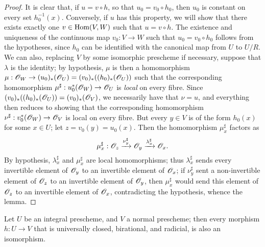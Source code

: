 \begin{proof}
It is clear that, if $u=v\circ h$, so that $u_0=v_0\circ h_0$, then $u_0$ is constant on every set $h_0^{-1}(x)$.
Conversely, if $u$ has this property, we will show that there exists exactly one $v\in\operatorname{Hom}(V,W)$ such that $u=v\circ h$.
The existence and uniqueness of the continuous map $v_0:V\to W$ such that $u_0=v_0\circ h_0$ follows from the hypotheses, since $h_0$ can be identified with the canonical map from $U$ to $U/R$.
We can also, replacing $V$ by some isomorphic prescheme if necessary, suppose that $\lambda$ is the identity;
by hypothesis, $\mu$ is then a homomorphism $\mu:\sh{O}_W\to(u_0)_*(\sh{O}_U) = (v_0)_*((h_0)_*(\sh{O}_U))$ such that the corresponding homomorphism $\mu^\sharp:u_0^*(\sh{O}_W)\to\sh{O}_U$ is \emph{local} on every fibre.
Since $(v_0)_*((h_0)_*(\mathscr{O}_U))=(v_0)_*(\mathscr{O}_V)$, we necessarily have that $\nu=u$, and everything then reduces to showing that the corresponding homomorphism $\nu^\sharp:v_0^*(\sh{O}_W)\to\sh{O}_V$ is local on every fibre.
But every $y\in V$ is of the form $h_0(x)$ for some $x\in U$;
let $z=v_0(y)=u_0(x)$.
Then  the homomorphism $\mu_x^\sharp$ factors as
\[
    \mu_x^\sharp: \mathscr{O}_z \xrightarrow{\nu_y^\sharp} \mathscr{O}_y \xrightarrow{\lambda_x^\sharp} \mathscr{O}_x.
\]
By hypothesis, $\lambda_x^\sharp$ and $\mu_x^\sharp$ are local homomorphisms;
thus $\lambda_x^\sharp$ sends every invertible element of $\mathscr{O}_y$ to an invertible element of $\mathscr{O}_x$;
if $\nu_y^\sharp$ sent a non-invertible element of $\mathscr{O}_z$ to an invertible element of $\mathscr{O}_y$, then $\mu_x^\sharp$ would send this element of $\mathscr{O}_z$ to an invertible element of $\mathscr{O}_x$, contradicting the hypothesis, whence the lemma.
\end{proof}

\begin{corollary}[8.11.2]
\label{II.8.11.2}
Let $U$ be an integral prescheme, and $V$ a normal prescheme;
then every morphism $h:U\to V$ that is universally closed, birational, and radicial, is also an isomorphism.
\end{corollary}

